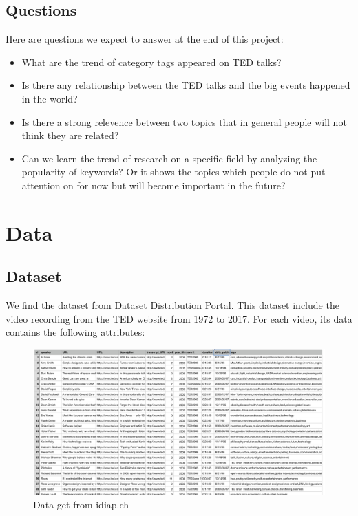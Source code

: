 \documentclass{report}
\numberwithin{figure}{section}
\begin{document}
\section{Questions}
\quad Here are questions we expect to answer at the end of this project:
\begin{itemize}
\item
What are the trend of category tags appeared on TED talks?
\item
Is there any relationship between the TED talks and the big events happened in the world? 
\item
Is there a strong relevence between two topics that in general people will not think they are related?
\item
Can we learn the trend of research on a specific field by analyzing the popularity of keywords? Or it shows the topics which people do not put attention on for now but will become important in the future?
\end{itemize}

\chapter{Data}
\section{Dataset}

\quad We find the dataset from Dataset Distribution Portal\cite{idiap}.
This dataset include the video recording from the TED website from 1972 to 2017. For each video, its data contains the following attributes:{}
\begin{figure} [h]
\begin{center}
\includegraphics[scale=0.4]{"csv"}
\caption{Data get from idiap.ch}
\label{fig:csv}
\end{center}
\end{figure}
\end{document}
